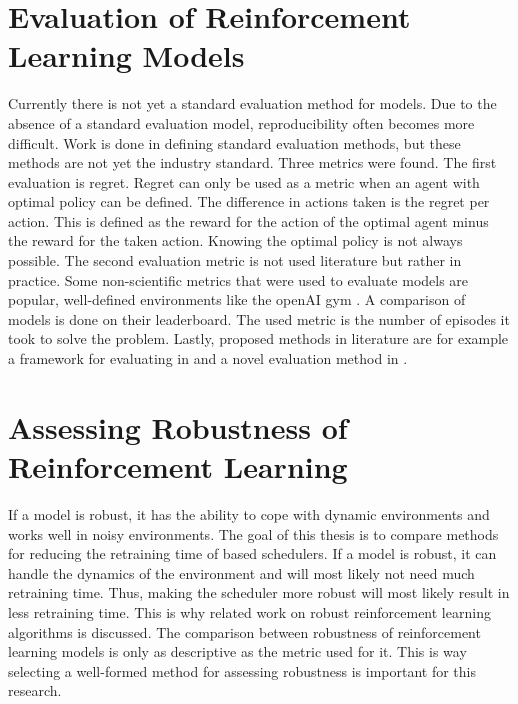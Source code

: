 

\section{Evaluation of Reinforcement Learning Models}


Currently there is not yet a standard evaluation method for \rl models. Due to
the absence of a standard evaluation model, reproducibility often becomes more
difficult. Work is done in defining standard evaluation methods, but these
methods are not yet the industry standard. Three metrics were found. The first
evaluation is regret. Regret can only be used as a metric when an agent with
optimal policy can be defined. The difference in actions taken is the regret
per action. This is defined as the reward for the action of the optimal agent
minus the reward for the taken action. Knowing the optimal policy is not
always possible. The second evaluation metric is not used literature but
rather in practice. Some non-scientific metrics that were used to evaluate \rl
models are popular, well-defined environments like the openAI gym
\cite{gym2016}. A comparison of \rl models is done on their
leaderboard. The used metric
is the number of episodes it took to solve the problem. Lastly, proposed
methods in literature are for example a framework for evaluating \rl in
 and a novel evaluation method in .


\section{Assessing Robustness of Reinforcement Learning}

If a \rl model is robust, it has the ability to cope with dynamic environments
and works well in noisy environments. The goal of this thesis is to compare
methods for reducing the retraining time of \rl based schedulers. If a model
is robust, it can handle the dynamics of the environment and will most likely
not need much retraining time. Thus, making the \rl scheduler more robust will
most likely result in less retraining time. This is why related work on robust
reinforcement learning algorithms is discussed. The comparison between
robustness of reinforcement learning models is only as descriptive as the
metric used for it. This is way selecting a well-formed method for assessing
robustness is important for this research.

